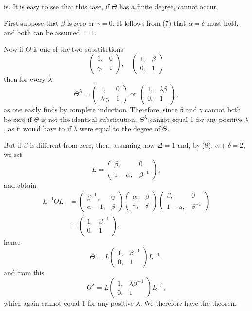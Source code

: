 is. It is easy to see that this case, if $\Theta$ has a finite
degree, cannot occur.

First suppose that $\beta$ is zero or $\gamma = 0$. It follows from (7) that
$\alpha = \delta$ must hold, and both can be assumed $= 1$.

Now if $\Theta$ is one of the two substitutions
\[
\begin{pmatrix} 1, & 0 \\ \gamma, & 1 \end{pmatrix}, \quad
\begin{pmatrix} 1, & \beta \\ 0, & 1 \end{pmatrix}
\]
then for every $\lambda$:
\[
\Theta^\lambda = \begin{pmatrix} 1, & 0 \\ \lambda\gamma, & 1 \end{pmatrix} \text{ or } \begin{pmatrix} 1, & \lambda\beta \\ 0, & 1 \end{pmatrix},
\]
as one easily finds by complete induction. Therefore,
since $\beta$ and $\gamma$ cannot both be zero if $\Theta$ is not
the identical substitution, $\Theta^\lambda$ cannot equal 1 for any positive $\lambda$,
as it would have to if $\lambda$ were equal to the degree of
$\Theta$.

But if $\beta$ is different from zero, then, assuming now
$\Delta = 1$ and, by (8), $\alpha + \delta = 2$, we set
\[
L = \begin{pmatrix} \beta, & 0 \\ 1-\alpha, & \beta^{-1} \end{pmatrix},
\]
and obtain
\[
\begin{aligned}
L^{-1}\Theta L &= \begin{pmatrix} \beta^{-1}, & 0 \\ \alpha-1, & \beta \end{pmatrix} \begin{pmatrix} \alpha, & \beta \\ \gamma, & \delta \end{pmatrix} \begin{pmatrix} \beta, & 0 \\ 1-\alpha, & \beta^{-1} \end{pmatrix} \\
&= \begin{pmatrix} 1, & \beta^{-1} \\ 0, & 1 \end{pmatrix},
\end{aligned}
\]
hence
\[
\Theta = L \begin{pmatrix} 1, & \beta^{-1} \\ 0, & 1 \end{pmatrix} L^{-1},
\]
and from this
\[
\Theta^\lambda = L \begin{pmatrix} 1, & \lambda\beta^{-1} \\ 0, & 1 \end{pmatrix} L^{-1},
\]
which again cannot equal 1 for any positive $\lambda$. We
therefore have the theorem:

